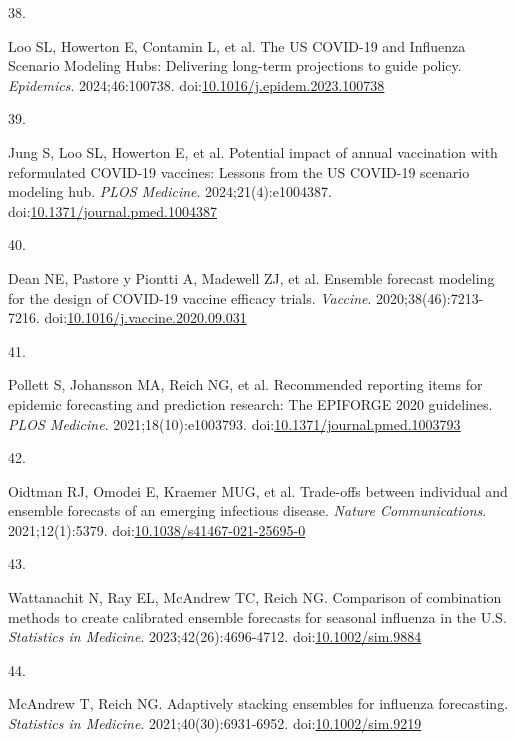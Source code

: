 \documentclass[
  letterpaper,
  DIV=11,
  numbers=noendperiod]{scrartcl}
\newlength{\cslhangindent}
\newlength{\csllabelwidth}
\newenvironment{CSLReferences}[2] %
 {\begin{list}{}{%
  \setlength{\itemindent}{0pt}
  \setlength{\leftmargin}{0pt}
  \setlength{\parsep}{0pt}
  \ifodd #1
   \setlength{\leftmargin}{\cslhangindent}
   \setlength{\itemindent}{-1\cslhangindent}
  \fi
  \setlength{\itemsep}{#2\baselineskip}}}
 {\end{list}}
\newcommand{\CSLLeftMargin}[1]{\parbox[t]{\csllabelwidth}{\strut#1\strut}}
\newcommand{\CSLRightInline}[1]{\parbox[t]{\linewidth - \csllabelwidth}{\strut#1\strut}}
\begin{document}
\begin{CSLReferences}{0}{1}
\CSLLeftMargin{38. }%
\CSLRightInline{Loo SL, Howerton E, Contamin L, et al. The {US}
{COVID}-19 and {Influenza} {Scenario} {Modeling} {Hubs}: {Delivering}
long-term projections to guide policy. \emph{Epidemics}. 2024;46:100738.
doi:\href{https://doi.org/10.1016/j.epidem.2023.100738}{10.1016/j.epidem.2023.100738}}

\CSLLeftMargin{39. }%
\CSLRightInline{Jung S, Loo SL, Howerton E, et al. Potential impact of
annual vaccination with reformulated {COVID}-19 vaccines: {Lessons} from
the {US} {COVID}-19 scenario modeling hub. \emph{PLOS Medicine}.
2024;21(4):e1004387.
doi:\href{https://doi.org/10.1371/journal.pmed.1004387}{10.1371/journal.pmed.1004387}}

\CSLLeftMargin{40. }%
\CSLRightInline{Dean NE, Pastore y Piontti A, Madewell ZJ, et al.
Ensemble forecast modeling for the design of {COVID}-19 vaccine efficacy
trials. \emph{Vaccine}. 2020;38(46):7213-7216.
doi:\href{https://doi.org/10.1016/j.vaccine.2020.09.031}{10.1016/j.vaccine.2020.09.031}}

\CSLLeftMargin{41. }%
\CSLRightInline{Pollett S, Johansson MA, Reich NG, et al. Recommended
reporting items for epidemic forecasting and prediction research: {The}
{EPIFORGE} 2020 guidelines. \emph{PLOS Medicine}. 2021;18(10):e1003793.
doi:\href{https://doi.org/10.1371/journal.pmed.1003793}{10.1371/journal.pmed.1003793}}

\CSLLeftMargin{42. }%
\CSLRightInline{Oidtman RJ, Omodei E, Kraemer MUG, et al. Trade-offs
between individual and ensemble forecasts of an emerging infectious
disease. \emph{Nature Communications}. 2021;12(1):5379.
doi:\href{https://doi.org/10.1038/s41467-021-25695-0}{10.1038/s41467-021-25695-0}}

\CSLLeftMargin{43. }%
\CSLRightInline{Wattanachit N, Ray EL, McAndrew TC, Reich NG. Comparison
of combination methods to create calibrated ensemble forecasts for
seasonal influenza in the {U}.{S}. \emph{Statistics in Medicine}.
2023;42(26):4696-4712.
doi:\href{https://doi.org/10.1002/sim.9884}{10.1002/sim.9884}}

\CSLLeftMargin{44. }%
\CSLRightInline{McAndrew T, Reich NG. Adaptively stacking ensembles for
influenza forecasting. \emph{Statistics in Medicine}.
2021;40(30):6931-6952.
doi:\href{https://doi.org/10.1002/sim.9219}{10.1002/sim.9219}}


\end{CSLReferences}
\end{document}
